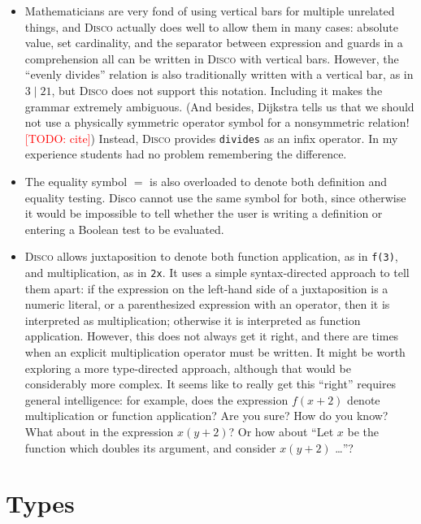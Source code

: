 \documentclass[submission,copyright,creativecommons]{eptcs}
\newcommand{\disco}{\textsc{Disco}\xspace}
\newcommand{\todo}[1]{\textcolor{red}{[TODO: #1]}}
\newcommand{\todo}[1]{}
\begin{document}
\begin{itemize}
\item Mathematicians are very fond of using vertical bars for multiple
  unrelated things, and \disco actually does well to allow them in
  many cases: absolute value, set cardinality, and the separator
  between expression and guards in a comprehension all can be written
  in \disco with vertical bars.  However, the ``evenly divides''
  relation is also traditionally written with a vertical bar, as in $3
  \mid 21$, but \disco does not support this notation.  Including it
  makes the grammar extremely ambiguous.  (And besides, Dijkstra tells
  us that we should not use a physically symmetric operator symbol for
  a nonsymmetric relation! \todo{cite}) Instead, \disco provides
  \texttt{divides} as an infix operator.  In my experience students
  had no problem remembering the difference.
\item The equality symbol $=$ is also overloaded to denote both
  definition and equality testing.  Disco cannot use the same symbol
  for both, since otherwise it would be impossible to tell whether the
  user is writing a definition or entering a Boolean test to be
  evaluated.
\item \disco allows juxtaposition to denote both function application,
  as in \texttt{f(3)}, and multiplication, as in \texttt{2x}.  It uses
  a simple syntax-directed approach to tell them apart: if the
  expression on the left-hand side of a juxtaposition is a numeric
  literal, or a parenthesized expression with an operator, then it is
  interpreted as multiplication; otherwise it is interpreted as
  function application.  However, this does not always get it right,
  and there are times when an explicit multiplication operator must be
  written.  It might be worth exploring a more type-directed approach,
  although that would be considerably more complex.  It seems like to
  really get this ``right'' requires general intelligence: for
  example, does the expression $f(x+2)$ denote multiplication or
  function application?  Are you sure?  How do you know?  What about
  in the expression $x(y+2)$?  Or how about ``Let $x$ be the function
  which doubles its argument, and consider $x(y+2)$ \dots''?
\end{itemize}

\section{Types}
\label{sec:types}
\end{document}
